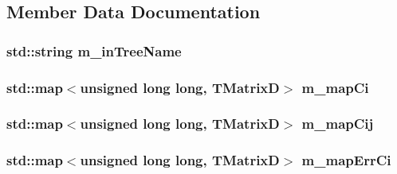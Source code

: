 \subsection{Member Data Documentation}
\hypertarget{classBiasAnalysis_ab68b9ae883b88b32d4c19a3899547b6c}{
\subsubsection[{m\+\_\+in\+Tree\+Name}]{\setlength{\rightskip}{0pt plus 5cm}std\+::string m\+\_\+in\+Tree\+Name\hspace{0.3cm}{\ttfamily [private]}}}\label{classBiasAnalysis_ab68b9ae883b88b32d4c19a3899547b6c}
\hypertarget{classBiasAnalysis_a4001a86dfd3b86e570c84d06d5ffbcda}{
\subsubsection[{m\+\_\+map\+Ci}]{\setlength{\rightskip}{0pt plus 5cm}std\+::map$<$unsigned long long, T\+Matrix\+D$>$ m\+\_\+map\+Ci\hspace{0.3cm}{\ttfamily [private]}}}\label{classBiasAnalysis_a4001a86dfd3b86e570c84d06d5ffbcda}
\hypertarget{classBiasAnalysis_ae41add82d66b3f3b94fa938f7d3173c7}{
\subsubsection[{m\+\_\+map\+Cij}]{\setlength{\rightskip}{0pt plus 5cm}std\+::map$<$unsigned long long, T\+Matrix\+D$>$ m\+\_\+map\+Cij\hspace{0.3cm}{\ttfamily [private]}}}\label{classBiasAnalysis_ae41add82d66b3f3b94fa938f7d3173c7}
\hypertarget{classBiasAnalysis_a3dbd3ee5b793f0498b17eff9d6edd20f}{
\subsubsection[{m\+\_\+map\+Err\+Ci}]{\setlength{\rightskip}{0pt plus 5cm}std\+::map$<$unsigned long long, T\+Matrix\+D$>$ m\+\_\+map\+Err\+Ci\hspace{0.3cm}{\ttfamily [private]}}}\label{classBiasAnalysis_a3dbd3ee5b793f0498b17eff9d6edd20f}
